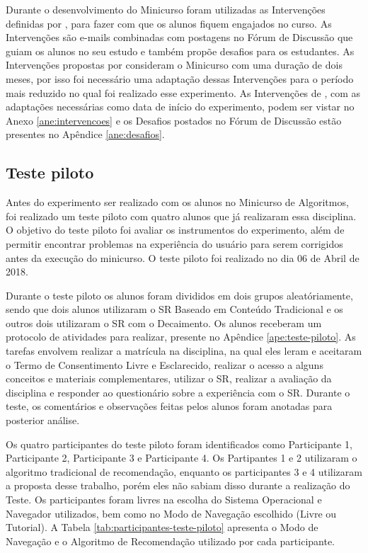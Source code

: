 Durante o desenvolvimento do Minicurso foram utilizadas as Intervenções definidas por , para
fazer com que os alunos fiquem engajados no curso. As Intervenções são e-mails combinadas com postagens no Fórum de Discussão
que guiam os alunos no seu estudo e também propõe desafios para os estudantes. As Intervenções propostas por 
consideram o Minicurso com uma duração de dois meses, por isso foi necessário uma adaptação dessas Intervenções para o período
mais reduzido no qual foi realizado esse experimento. As Intervenções de , com as adaptações
necessárias como data de início do experimento, podem
ser vistar no Anexo \ref{ane:intervencoes} e os Desafios postados no Fórum de Discussão estão presentes no Apêndice \ref{ane:desafios}.

\subsection{Teste piloto}\label{section:planejamento-teste-piloto}

Antes do experimento ser realizado com os alunos no Minicurso de Algoritmos, foi realizado um teste piloto com
quatro alunos que já realizaram essa disciplina. O objetivo do teste piloto foi avaliar os instrumentos do experimento,
além de permitir encontrar problemas na experiência do usuário para serem corrigidos antes da execução do minicurso. O teste piloto
foi realizado no dia 06 de Abril de 2018.

Durante o teste piloto os alunos foram divididos em dois grupos aleatóriamente, sendo que dois alunos utilizaram o SR
Baseado em Conteúdo Tradicional e os outros dois utilizaram o SR com o Decaimento. Os alunos receberam
um protocolo de atividades para realizar, presente no Apêndice \ref{ape:teste-piloto}. As tarefas envolvem
realizar a matrícula na disciplina, na qual eles leram e aceitaram o Termo de Consentimento Livre e Esclarecido, realizar
o acesso a alguns conceitos e materiais complementares, utilizar o SR, realizar a avaliação da disciplina e responder
ao questionário sobre a experiência com o SR. Durante o teste, os comentários e observações feitas pelos alunos foram
anotadas para posterior análise.

Os quatro participantes do teste piloto foram identificados como Participante 1, Participante 2,
Participante 3 e Participante 4. Os Partipantes 1 e 2 utilizaram o algoritmo tradicional de recomendação, enquanto os
participantes 3 e 4 utilizaram a proposta desse trabalho, porém eles não sabiam disso durante a realização do Teste. Os
participantes foram livres na escolha do Sistema Operacional e Navegador utilizados, bem como no Modo de Navegação
escolhido (Livre ou Tutorial). A Tabela \ref{tab:participantes-teste-piloto} apresenta o Modo de Navegação e o Algoritmo
de Recomendação utilizado por cada participante.

